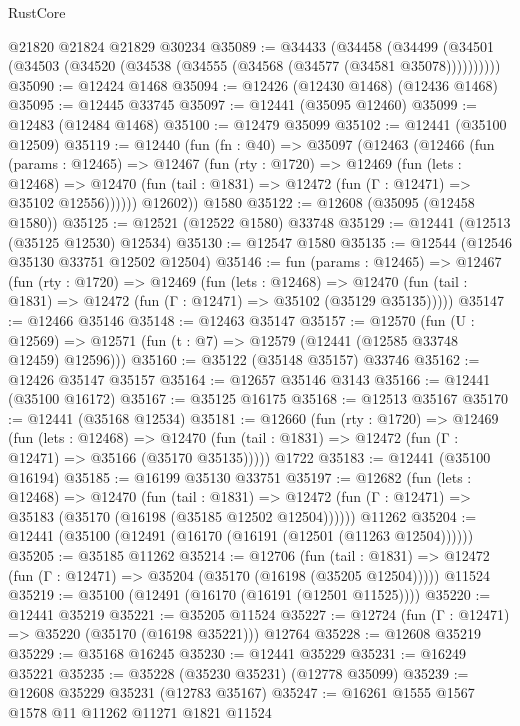 \begin{lexlean}{RustCore}
\begin{coremodule}
    @21820
    @21824
    @21829
    @30234
@35089 := @34433
    (@34458 (@34499 (@34501 (@34503 (@34520 (@34538 (@34555 (@34568 (@34577 (@34581 @35078))))))))))
@35090 := @12424 @1468
@35094 := @12426 (@12430 @1468) (@12436 @1468)
@35095 := @12445 @33745
@35097 := @12441 (@35095 @12460)
@35099 := @12483 (@12484 @1468)
@35100 := @12479 @35099
@35102 := @12441 (@35100 @12509)
@35119 := @12440
    (fun (fn : @40) =>
    @35097
      (@12463
        (@12466
          (fun (params : @12465) =>
          @12467
            (fun (rty : @1720) =>
            @12469
              (fun (lets : @12468) =>
              @12470 (fun (tail : @1831) => @12472 (fun (Γ : @12471) => @35102 @12556))))))
        @12602))
    @1580
@35122 := @12608 (@35095 (@12458 @1580))
@35125 := @12521 (@12522 @1580) @33748
@35129 := @12441 (@12513 (@35125 @12530) @12534)
@35130 := @12547 @1580
@35135 := @12544 (@12546 @35130 @33751 @12502 @12504)
@35146 := fun (params : @12465) =>
  @12467
    (fun (rty : @1720) =>
    @12469
      (fun (lets : @12468) =>
      @12470 (fun (tail : @1831) => @12472 (fun (Γ : @12471) => @35102 (@35129 @35135)))))
@35147 := @12466 @35146
@35148 := @12463 @35147
@35157 := @12570
    (fun (U : @12569) => @12571 (fun (t : @7) => @12579 (@12441 (@12585 @33748 @12459) @12596)))
@35160 := @35122 (@35148 @35157) @33746
@35162 := @12426 @35147 @35157
@35164 := @12657 @35146 @3143
@35166 := @12441 (@35100 @16172)
@35167 := @35125 @16175
@35168 := @12513 @35167
@35170 := @12441 (@35168 @12534)
@35181 := @12660
    (fun (rty : @1720) =>
    @12469
      (fun (lets : @12468) =>
      @12470 (fun (tail : @1831) => @12472 (fun (Γ : @12471) => @35166 (@35170 @35135)))))
    @1722
@35183 := @12441 (@35100 @16194)
@35185 := @16199 @35130 @33751
@35197 := @12682
    (fun (lets : @12468) =>
    @12470
      (fun (tail : @1831) =>
      @12472 (fun (Γ : @12471) => @35183 (@35170 (@16198 (@35185 @12502 @12504))))))
    @11262
@35204 := @12441 (@35100 (@12491 (@16170 (@16191 (@12501 (@11263 @12504))))))
@35205 := @35185 @11262
@35214 := @12706
    (fun (tail : @1831) => @12472 (fun (Γ : @12471) => @35204 (@35170 (@16198 (@35205 @12504)))))
    @11524
@35219 := @35100 (@12491 (@16170 (@16191 (@12501 @11525))))
@35220 := @12441 @35219
@35221 := @35205 @11524
@35227 := @12724 (fun (Γ : @12471) => @35220 (@35170 (@16198 @35221))) @12764
@35228 := @12608 @35219
@35229 := @35168 @16245
@35230 := @12441 @35229
@35231 := @16249 @35221
@35235 := @35228 (@35230 @35231) (@12778 @35099)
@35239 := @12608 @35229 @35231 (@12783 @35167)
@35247 := @16261 @1555 @1567 @1578 @11 @11262 @11271 @1821 @11524

\end{coremodule}
\end{lexlean}
